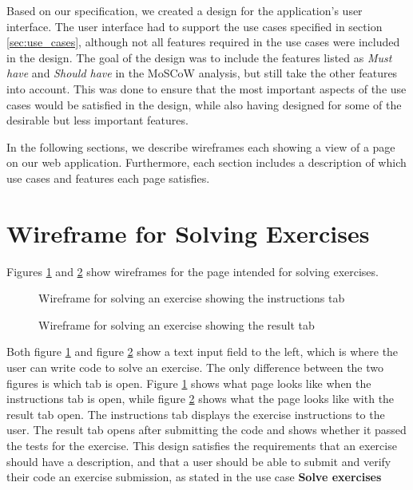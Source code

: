 Based on our specification, we created a design for the application's user interface. The user interface had to support the use cases specified in section \ref{sec:use_cases}, although not all features required in the use cases were included in the design. The goal of the design was to include the features listed as \textit{Must have} and \textit{Should have} in the MoSCoW analysis, but still take the other features into account. This was done to ensure that the most important aspects of the use cases would be satisfied in the design, while also having designed for some of the desirable but less important features.

In the following sections, we describe wireframes each showing a view of a page on our web application. Furthermore, each section includes a description of which use cases and features each page satisfies.

\section{Wireframe for Solving Exercises}
Figures \ref{fig:wfExerciseInstructions} and \ref{fig:wfExerciseResult} show wireframes for the page intended for solving exercises.

\begin{figure}[H]
	\centering
	\caption{Wireframe for solving an exercise showing the instructions tab}
	\label{fig:wfExerciseInstructions}
\end{figure}

\begin{figure}[H]
	\centering
	\caption{Wireframe for solving an exercise showing the result tab}
	\label{fig:wfExerciseResult}
\end{figure}

Both figure \ref{fig:wfExerciseInstructions} and figure \ref{fig:wfExerciseResult} show a text input field to the left, which is where the user can write code to solve an exercise.
The only difference between the two figures is which tab is open.
Figure \ref{fig:wfExerciseInstructions} shows what page looks like when the instructions tab is open, while figure \ref{fig:wfExerciseResult} shows what the page looks like with the result tab open.
The instructions tab displays the exercise instructions to the user.
The result tab opens after submitting the code and shows whether it passed the tests for the exercise.
This design satisfies the requirements that an exercise should have a description, and that a user should be able to submit and verify their code an exercise submission, as stated in the use case \textbf{Solve exercises}

